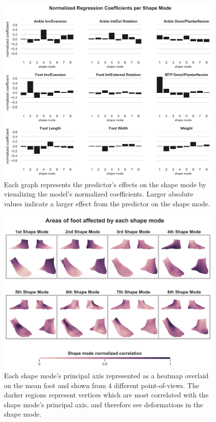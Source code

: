 \documentclass[preprint]{elsarticle}
\begin{document}
\newpage

\begin{figure}
\hypertarget{fig:coefs}{%
\centering
\includegraphics[width=1\textwidth,height=\textheight]{fig/Fig5.png}
\caption{Each graph represents the predictor's effects on the shape mode by visualizing the model's normalized coefficients. Larger absolute values indicate a larger effect from the predictor on the shape mode.}\label{fig:coefs}
}
\end{figure}

\newpage

\begin{figure}
\hypertarget{fig:pca_quad}{%
\centering
\includegraphics[width=1\textwidth,height=\textheight]{fig/Fig6.png}
\caption{Each shape mode's principal axis represented as a heatmap overlaid on the mean foot and shown from 4 different point-of-views. The darker regions represent vertices which are most correlated with the shape mode's principal axis, and therefore see deformations in the shape mode.}\label{fig:pca_quad}
}
\end{figure}
\end{document}
